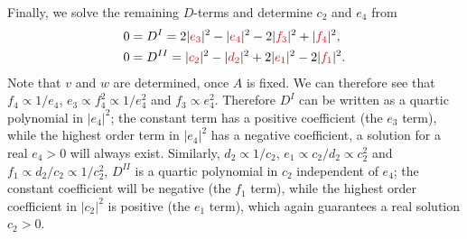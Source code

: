 \documentclass[a4paper,12pt]{article}
\def\RED{\textcolor{red}}
\begin{document}
\begin{itemize}
Finally, we solve the remaining $D$-terms and determine $c_2$ and $e_4$ from
\begin{align}
0&=D^{I}=2 |\RED{e_3}|^2-|\RED{e_4}|^2-2 |\RED{f_3}|^2+|\RED{f_4}|^2,\\
0&=D^{II}=|\RED{c_2}|^2-|\RED{d_2}|^2+2 |\RED{e_1}|^2-2 |\RED{f_1}|^2.
\end{align}
Note that $v$ and $w$ are determined, once $A$ is fixed. We can therefore see that $f_4\propto 1/e_4$, $e_3\propto f_4^2\propto 1/e_4^2$ and $f_3\propto e_4^2$. Therefore $D^{I}$ can be written as a quartic polynomial in $|e_4|^2$; the constant term has a positive coefficient (the $e_3$ term), while the highest order term in $|e_4|^2$ has a negative coefficient, a solution for a real $e_4>0$ will always exist. Similarly,
$d_2\propto 1/c_2$, $e_1\propto c_2/d_2\propto c_2^2$ and $f_1\propto d_2/c_2\propto 1/c_2^2$, $D^{II}$ is a quartic polynomial in $c_2$ independent of $e_4$; the constant coefficient will be negative (the $f_1$ term), while the highest order coefficient in $|c_2|^2$ is positive (the $e_1$ term), which again guarantees a real solution $c_2>0$.

\end{itemize}
\end{document}
